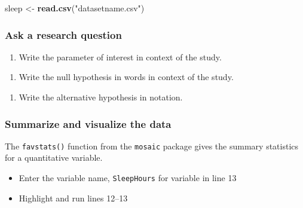 \documentclass[
]{report}
\newenvironment{Shaded}{\begin{snugshade}}{\end{snugshade}}
\newcommand{\FunctionTok}[1]{\textcolor[rgb]{0.13,0.29,0.53}{\textbf{#1}}}
\newcommand{\NormalTok}[1]{#1}
\newcommand{\OtherTok}[1]{\textcolor[rgb]{0.56,0.35,0.01}{#1}}
\newcommand{\StringTok}[1]{\textcolor[rgb]{0.31,0.60,0.02}{#1}}
\providecommand{\tightlist}{%
  \setlength{\itemsep}{0pt}\setlength{\parskip}{0pt}}
\begin{document}
\begin{Shaded}
\begin{Highlighting}[]
\NormalTok{sleep }\OtherTok{\textless{}{-}} \FunctionTok{read.csv}\NormalTok{(}\StringTok{"datasetname.csv"}\NormalTok{)}
\end{Highlighting}
\end{Shaded}

\subsubsection*{Ask a research question}\label{ask-a-research-question-1}

\begin{enumerate}
\def\labelenumi{\arabic{enumi}.}
\tightlist
\item
  Write the parameter of interest in context of the study.
\end{enumerate}

\vspace{1in}

\begin{enumerate}
\def\labelenumi{\arabic{enumi}.}
\setcounter{enumi}{1}
\tightlist
\item
  Write the null hypothesis in words in context of the study.
\end{enumerate}

\vspace{1in}

\begin{enumerate}
\def\labelenumi{\arabic{enumi}.}
\setcounter{enumi}{2}
\tightlist
\item
  Write the alternative hypothesis in notation.
\end{enumerate}

\vspace{0.4in}

\subsubsection*{Summarize and visualize the data}\label{summarize-and-visualize-the-data-1}

The \texttt{favstats()} function from the \texttt{mosaic} package gives the summary statistics for a quantitative variable.

\begin{itemize}
\item
  Enter the variable name, \texttt{SleepHours} for variable in line 13
\item
  Highlight and run lines 12--13
\end{itemize}
\end{document}
